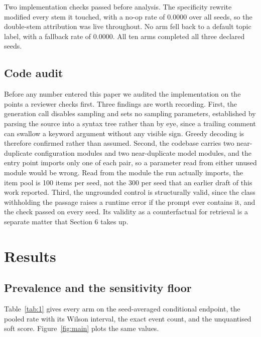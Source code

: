 \documentclass[11pt]{article}
\begin{document}
Two implementation checks passed before analysis. The specificity rewrite modified every stem it touched, with a no-op rate of 0.0000 over all seeds, so the double-stem attribution was live throughout. No arm fell back to a default topic label, with a fallback rate of 0.0000. All ten arms completed all three declared seeds.

\subsection{Code audit}

Before any number entered this paper we audited the implementation on the points a reviewer checks first. Three findings are worth recording. First, the generation call disables sampling and sets no sampling parameters, established by parsing the source into a syntax tree rather than by eye, since a trailing comment can swallow a keyword argument without any visible sign. Greedy decoding is therefore confirmed rather than assumed. Second, the codebase carries two near-duplicate configuration modules and two near-duplicate model modules, and the entry point imports only one of each pair, so a parameter read from either unused module would be wrong. Read from the module the run actually imports, the item pool is 100 items per seed, not the 300 per seed that an earlier draft of this work reported. Third, the ungrounded control is structurally valid, since the class withholding the passage raises a runtime error if the prompt ever contains it, and the check passed on every seed. Its validity as a counterfactual for retrieval is a separate matter that Section 6 takes up.

\section{Results}

\subsection{Prevalence and the sensitivity floor}

Table~\ref{tab:1} gives every arm on the seed-averaged conditional endpoint, the pooled rate with its Wilson interval, the exact event count, and the unquantised soft score. Figure~\ref{fig:main} plots the same values.
\end{document}
